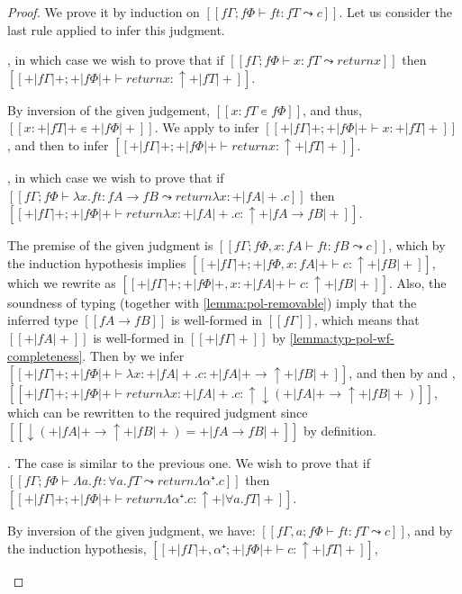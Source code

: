 \lemmaPolarSoundness*
\begin{proof}
  We prove it by induction on $[[fΓ ; fΦ ⊢ ft : fT ⤳ c]]$.
  Let us consider the last rule applied to infer this judgment.
  \begin{caseof}
    \item {},
      in which case
      we wish to prove that if
      $[[ fΓ ; fΦ ⊢ x : fT  ⤳  return x]]$
      then 
      $[[+|fΓ|+ ; +|fΦ|+ ⊢ return x : ↑+|fT|+]]$.

      By inversion of the given judgement, 
      $[[x : fT ∊ fΦ]]$, and thus, 
      $[[x : +|fT|+ ∊ +|fΦ|+]]$.
      We apply 
      to infer $[[+|fΓ|+ ; +|fΦ|+  ⊢ x : +|fT|+]]$, 
      and then 
      to infer $[[+|fΓ|+ ; +|fΦ|+  ⊢ return x : ↑+|fT|+]]$.

    \item {},
      in which case we wish to prove that if
      $[[ fΓ ; fΦ ⊢ λx. ft : fA → fB  ⤳  return {λx : +|fA|+. c}]]$
      then
      $[[+|fΓ|+ ; +|fΦ|+ ⊢ return {λx : +|fA|+. c} : ↑+|fA → fB|+]]$.

      The premise of the given judgment is 
      $[[fΓ; fΦ, x:fA  ⊢ ft : fB  ⤳ c]]$, which by the induction hypothesis
      implies $[[+|fΓ|+ ; +|fΦ, x:fA|+  ⊢ c : ↑+|fB|+]]$,
      which we rewrite as 
      $[[+|fΓ|+ ; +|fΦ|+, x:+|fA|+  ⊢ c : ↑+|fB|+]]$.
      Also, the soundness of \systemf typing (together with \cref{lemma:pol-removable}) 
      imply that the inferred type $[[fA → fB]]$ is well-formed in $[[fΓ]]$,
      which means that $[[+|fA|+]]$ is well-formed in 
      $[[+|fΓ|+]]$ by \cref{lemma:typ-pol-wf-completeness}.
      Then by  we infer 
      $[[+|fΓ|+ ; +|fΦ|+  ⊢ λx : +|fA|+. c : +|fA|+ → ↑+|fB|+]]$,
      and then by  and , 
      $[[+|fΓ|+ ; +|fΦ|+  ⊢ return {λx : +|fA|+. c} : ↑↓(+|fA|+ → ↑+|fB|+)]]$, 
      which can be rewritten to the required judgment since
      $[[↓(+|fA|+ → ↑+|fB|+) = +|fA → fB|+]]$ by definition.

    \item {}.
      The case is similar to the previous one.
      We wish to prove that if
      $[[ fΓ ; fΦ ⊢ Λa.ft : ∀a.fT  ⤳  return {Λα⁺.c}]]$
      then
      $[[ +|fΓ|+ ; +|fΦ|+ ⊢ return {Λα⁺.c} : ↑+|∀a.fT|+]]$.

      By inversion of the given judgment, we have:
      $[[fΓ, a ; fΦ ⊢ ft : fT  ⤳ c]]$, and by the induction hypothesis,
      $[[+|fΓ|+, α⁺ ; +|fΦ|+ ⊢ c : ↑+|fT|+]]$,


\end{caseof}
\end{proof}
